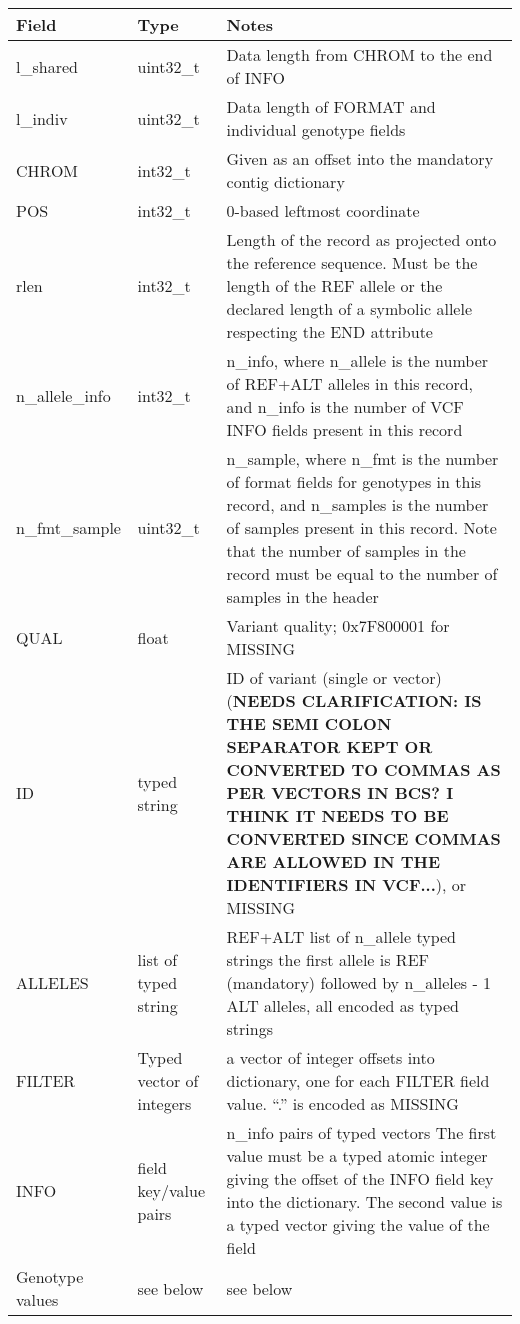 \documentclass[8pt]{article}
\begin{document}
{\small
\begin{tabular}{|l | l | p{30em} | } \hline
\textbf{Field} &	\textbf{Type} &	\textbf{Notes} \\ \hline
l\_shared &	uint32\_t &	Data length from CHROM to the end of INFO \\ \hline
l\_indiv  &	uint32\_t &	Data length of FORMAT and individual genotype fields \\ \hline
CHROM	  & int32\_t  &	Given as an offset into the mandatory contig dictionary \\ \hline
POS	      & int32\_t  &	0-based leftmost coordinate \\ \hline
rlen      &	int32\_t  &	Length of the record as projected onto the reference sequence. Must be the length of the REF allele or the declared length of a symbolic allele respecting the END attribute \\ \hline
n\_allele\_info	& int32\_t	& n\_info, where n\_allele is the number of REF+ALT alleles in this record, and n\_info is the number of VCF INFO fields present in this record \\ \hline
n\_fmt\_sample	& uint32\_t	& n\_sample, where n\_fmt is the number of format fields for genotypes in this record, and n\_samples is the number of samples present in this record.  Note that the number of samples in the record must be equal to the number of samples in the header \\ \hline
QUAL	  & float	  & Variant quality; 0x7F800001 for  MISSING \\ \hline
ID	      & typed string & ID of variant (single or vector) ({\bf NEEDS CLARIFICATION: IS THE SEMI COLON SEPARATOR KEPT OR CONVERTED TO COMMAS AS PER VECTORS IN BCS? I THINK IT NEEDS TO BE CONVERTED SINCE COMMAS ARE ALLOWED IN THE IDENTIFIERS IN VCF...}), or MISSING \\ \hline
ALLELES & list of typed string & REF+ALT	list of n\_allele typed strings	the first allele is REF (mandatory) followed by n\_alleles - 1 ALT alleles, all encoded as typed strings \\ \hline
FILTER	  & Typed vector of integers	& a vector of integer offsets into dictionary, one for each FILTER field value.  ``.'' is encoded as MISSING \\ \hline
INFO      & field key/value pairs	    & n\_info pairs of typed vectors	The first value must be a typed atomic integer giving the offset of the INFO field key into the dictionary.  The second value is a typed vector giving the value of the field \\ \hline
Genotype values &	see below	& see below \\ \hline
\end{tabular}}
\end{document}
